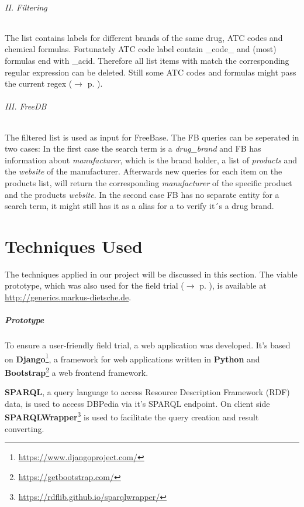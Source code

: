 \documentclass[11pt,titlepage,oneside,openany]{book}
\begin{document}
\subparagraph{II. Filtering}
The list contains labels for different brands of the same drug, ATC codes and chemical formulas. Fortunately ATC code label contain \_code\_ and (most) formulas end with \_acid. Therefore all list items with match the corresponding regular expression can be deleted. Still some ATC codes and formulas might pass the current regex ($\rightarrow$ p. \pageref{limitations:filtering}).

\subparagraph{III. FreeDB}
The filtered list is used as input for FreeBase. The FB queries can be seperated in two cases: In the first case the search term is a \textit{drug\_brand} and FB has information about \textit{manufacturer}, which is the brand holder, a list of \textit{products} and the \textit{website} of the manufacturer. Afterwards new queries for each item on the products list, will return the corresponding \textit{manufacturer} of the specific product and the products \textit{website}. In the second case FB has no separate entity for a search term, it might still has it as a alias for a  to verify it´s a drug brand.


\chapter{Techniques Used}
\label{cha:technique}



The techniques applied in our project will be discussed in this section. The viable prototype, which was also used for the field trial ($\rightarrow$ p. \pageref{field_trial}), is available at \url{http://generics.markus-dietsche.de}.

\paragraph{Prototype}
\label{prototype}


To ensure a user-friendly field trial, a web application was developed. It's based on 
\textbf{Django}\footnote{\url{https://www.djangoproject.com/}}, a framework for web applications written in \textbf{Python} and \textbf{Bootstrap}\footnote{\url{https://getbootstrap.com/}} a web frontend framework.

\label{sparql}
\textbf{SPARQL}, a query language to access Resource Description Framework (RDF) data, is used to access DBPedia via it's SPARQL endpoint. On client side \textbf{SPARQLWrapper}\footnote{\url{https://rdflib.github.io/sparqlwrapper/}} is used to facilitate the query creation and result converting. 
\end{document}
